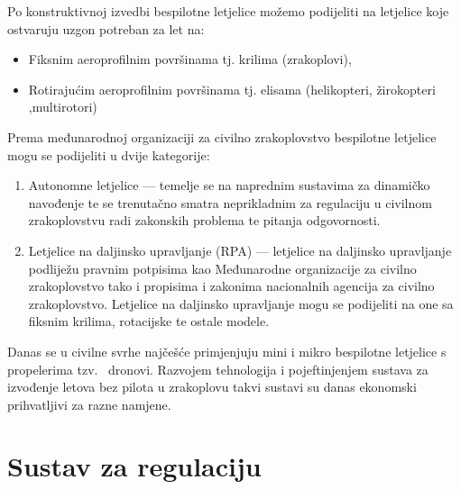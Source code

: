 \documentclass[times, utf8, diplomski]{fer}
\begin{document}
Po konstruktivnoj izvedbi bespilotne letjelice možemo podijeliti na letjelice koje ostvaruju uzgon potreban za let na:\begin{itemize}
\item Fiksnim aeroprofilnim površinama tj. krilima (zrakoplovi),
\item Rotirajućim  aeroprofilnim  površinama  tj.  elisama  (helikopteri,  žirokopteri ,multirotori) 
\end{itemize}
Prema  međunarodnoj  organizaciji  za civilno  zrakoplovstvo   bespilotne letjelice mogu se podijeliti u dvije kategorije:\begin{enumerate}
\item Autonomne letjelice --- temelje se na naprednim sustavima za dinamičko navođenje te se trenutačno smatra neprikladnim za regulaciju u civilnom zrakoplovstvu radi zakonskih problema te pitanja odgovornosti.
\item Letjelice na daljinsko upravljanje (RPA) --- letjelice na daljinsko upravljanje podliježu pravnim  potpisima  kao  Međunarodne organizacije  za  civilno  zrakoplovstvo  tako  i propisima  i  zakonima  nacionalnih  agencija  za  civilno  zrakoplovstvo.  Letjelice  na daljinsko upravljanje mogu se podijeliti na one sa fiksnim krilima, rotacijske te ostale modele.
\end{enumerate}
Danas  se  u  civilne  svrhe  najčešće  primjenjuju  mini  i  mikro bespilotne  letjelice  s propelerima  tzv.  ~dronovi.  Razvojem  tehnologija  i  pojeftinjenjem  sustava  za  izvođenje letova  bez  pilota  u  zrakoplovu  takvi  sustavi  su  danas  ekonomski  prihvatljivi  za  razne namjene. 


\section{Sustav za regulaciju}
\end{document}
